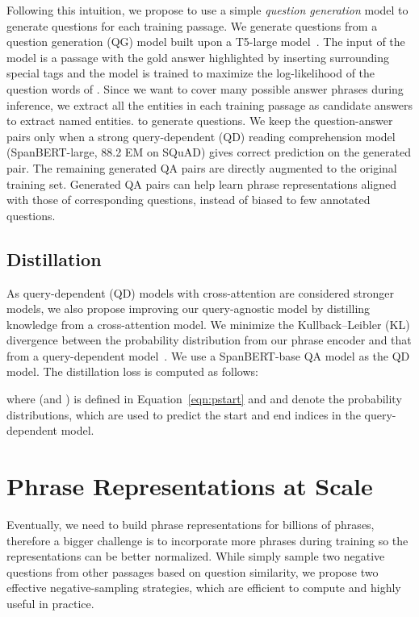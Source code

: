 \documentclass[11pt,a4paper]{article}
\newcommand\ti[1]{\textit{#1}}
\begin{document}
Following this intuition, we propose to use a simple \ti{question generation} model to generate questions for each training passage.
We generate questions from a question generation (QG) model built upon a T5-large model~\citep{raffel2020exploring}.
The input of the model is a passage  with the gold answer  highlighted by inserting surrounding special tags and the model is trained to maximize the log-likelihood of the question words of . Since we want to cover many possible answer phrases during inference, we extract all the entities in each training passage as candidate answers to extract named entities. to generate questions.
We keep the question-answer pairs only when a strong query-dependent (QD) reading comprehension model (SpanBERT-large, 88.2 EM on SQuAD) gives correct prediction on the generated pair.
The remaining generated QA pairs  are directly augmented to the original training set. Generated QA pairs can help learn phrase representations aligned with those of corresponding questions, instead of biased to few annotated questions.








\subsection{Distillation}
\label{sec:distillation}
As query-dependent (QD) models with cross-attention are considered stronger models, we also propose improving our query-agnostic model by distilling knowledge from a cross-attention model.
We minimize the Kullback–Leibler (KL) divergence between the probability distribution from our phrase encoder and that from a query-dependent model~\citep{hinton2015distilling}. We use a SpanBERT-base QA model as the QD model.
The distillation loss is computed as follows:

where  (and ) is defined in Equation~\eqref{eqn:pstart} and  and  denote the probability distributions, which are used to predict the start and end indices in the query-dependent model.


\section{Phrase Representations at Scale}
\label{sec:normalization}


Eventually, we need to build phrase representations for billions of phrases, therefore a bigger challenge is to incorporate more phrases during training so the representations can be better normalized.
While \citet{seo2019real} simply sample two negative questions from other passages based on question similarity, we propose two effective negative-sampling strategies, which are efficient to compute and highly useful in practice.
\end{document}
